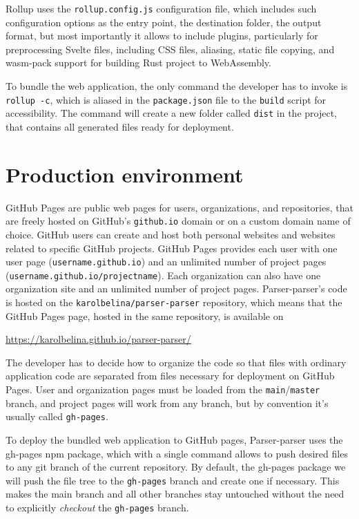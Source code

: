 \documentclass[english,engineering]{wizthesis}
\newcommand{\thisproject}{Parser-parser}
\begin{document}
Rollup uses the \texttt{rollup.config.js} configuration file, which includes
such configuration options as the entry point, the destination folder, the
output format, but most importantly it allows to include plugins, particularly
for preprocessing Svelte files, including CSS files, aliasing, static file
copying, and wasm-pack support for building Rust project to WebAssembly.

To bundle the web application, the only command the developer has to invoke is
\texttt{rollup -c}, which is aliased in the \texttt{package.json} file to the
\texttt{build} script for accessibility. The command will create a new folder
called \texttt{dist} in the project, that contains all generated files ready
for deployment.

\section{Production environment}

GitHub Pages are public web pages for users, organizations, and repositories,
that are freely hosted on GitHub's \texttt{github.io} domain or on a custom
domain name of choice. GitHub users can create and host both personal websites
and websites related to specific GitHub projects. GitHub Pages provides each
user with one user page (\texttt{username.github.io}) and an unlimited number of
project pages (\texttt{username.github.io/projectname}). Each organization can
also have one organization site and an unlimited number of project pages.
\thisproject{}'s code is hosted on the \texttt{karolbelina/parser-parser}
repository, which means that the GitHub Pages page, hosted in the same
repository, is available on
\begin{center}
  \url{https://karolbelina.github.io/parser-parser/}
\end{center}
The developer has to decide how to organize the code so that files with ordinary
application code are separated from files necessary for deployment on GitHub
Pages. User and organization pages must be loaded from the
\texttt{main}/\texttt{master} branch, and project pages will work from any
branch, but by convention it's usually called \texttt{gh-pages}.

To deploy the bundled web application to GitHub pages, \thisproject{} uses the
gh-pages npm package, which with a single command allows to push desired files
to any git branch of the current repository. By default, the gh-pages package we
will push the file tree to the \texttt{gh-pages} branch and create one if
necessary. This makes the main branch and all other branches stay untouched
without the need to explicitly \emph{checkout} the \texttt{gh-pages} branch.
\end{document}

